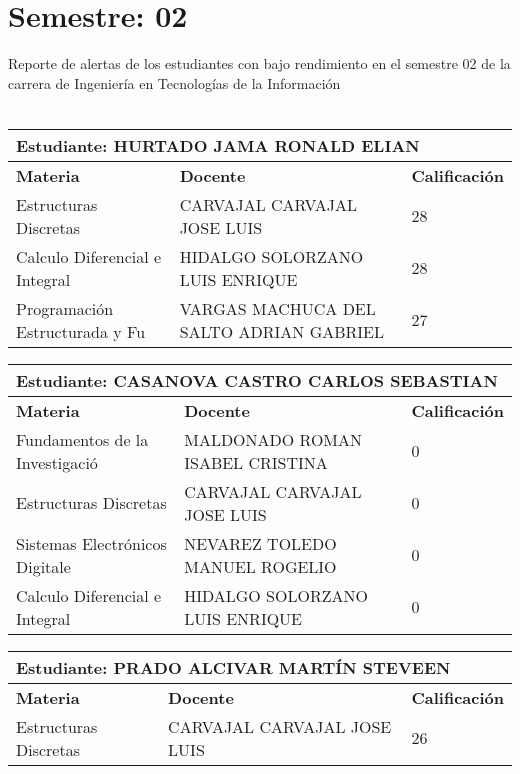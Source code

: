 \section{Semestre: 02}
        Reporte de alertas de los estudiantes con bajo rendimiento en el semestre 02 de la carrera de 
        Ingeniería en Tecnologías de la Información\\\\\small
\begin{tabularx}{\textwidth}{|p{5cm}|p{7cm}|X|}
\hline
\multicolumn{3}{|p{\dimexpr\textwidth-2\tabcolsep-2\arrayrulewidth}|}{\textbf{Estudiante: HURTADO JAMA RONALD ELIAN }}\\\hline
\textbf{Materia} & \textbf{Docente} & \textbf{Calificación} \\ \hline
Estructuras Discretas & CARVAJAL CARVAJAL JOSE LUIS  & 28 \\ \hline
Calculo Diferencial e Integral & HIDALGO SOLORZANO LUIS ENRIQUE  & 28 \\ \hline
Programación Estructurada y Fu & VARGAS MACHUCA DEL SALTO ADRIAN GABRIEL  & 27 \\ \hline
\end{tabularx}\vspace{10mm}
\small
\begin{tabularx}{\textwidth}{|p{5cm}|p{7cm}|X|}
\hline
\multicolumn{3}{|p{\dimexpr\textwidth-2\tabcolsep-2\arrayrulewidth}|}{\textbf{Estudiante: CASANOVA CASTRO CARLOS SEBASTIAN }}\\\hline
\textbf{Materia} & \textbf{Docente} & \textbf{Calificación} \\ \hline
Fundamentos de la Investigació & MALDONADO ROMAN ISABEL CRISTINA  & 0 \\ \hline
Estructuras Discretas & CARVAJAL CARVAJAL JOSE LUIS  & 0 \\ \hline
Sistemas Electrónicos Digitale & NEVAREZ TOLEDO MANUEL ROGELIO  & 0 \\ \hline
Calculo Diferencial e Integral & HIDALGO SOLORZANO LUIS ENRIQUE  & 0 \\ \hline
\end{tabularx}\vspace{10mm}
\small
\begin{tabularx}{\textwidth}{|p{5cm}|p{7cm}|X|}
\hline
\multicolumn{3}{|p{\dimexpr\textwidth-2\tabcolsep-2\arrayrulewidth}|}{\textbf{Estudiante: PRADO ALCIVAR MARTÍN STEVEEN }}\\\hline
\textbf{Materia} & \textbf{Docente} & \textbf{Calificación} \\ \hline
Estructuras Discretas & CARVAJAL CARVAJAL JOSE LUIS  & 26 \\ \hline
\end{tabularx}\vspace{10mm}
